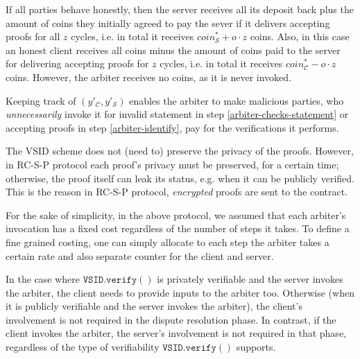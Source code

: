 \begin{remark} If all parties behave honestly,   then the server receives all its deposit back plus the amount of coins they initially agreed to pay the sever if it  delivers accepting proofs for all $z$ cycles, i.e. in total it receives $coin^{\scriptscriptstyle *}_{\scriptscriptstyle\mathcal S}+o\cdot z$ coins. Also, in this case an honest client receives all coins minus the amount of coins paid to the server for delivering accepting proofs for $z$ cycles, i.e. in total it receives $coin^{\scriptscriptstyle *}_{\scriptscriptstyle\mathcal C}-o\cdot z$ coins. However, the arbiter receives no coins, as it is never invoked. 


\begin{remark}
Keeping track of  $(y'_{\scriptscriptstyle\mathcal C},y'_{\scriptscriptstyle\mathcal S})$ enables the arbiter to make malicious parties, who \emph{unnecessarily} invoke  it for invalid statement in step \ref{arbiter-checks-statement} or  accepting proofs in step \ref{arbiter-identify}, pay  for the verifications it performs. 
\end{remark}





\end{remark}
\begin{remark} The VSID scheme  does not (need to) preserve the privacy of the proofs. However, in RC-S-P  protocol  each proof's privacy must be preserved, for a certain time; otherwise, the proof itself can leak its status, e.g. when it can be publicly verified. This is the reason in RC-S-P protocol,  \emph{encrypted} proofs are sent to the contract.   
\end{remark}


\begin{remark}
For the sake of simplicity, in the above protocol, we assumed that each arbiter's invocation has a fixed  cost regardless of the number of steps it takes. To define a fine grained costing, one can simply allocate to each step the arbiter takes a certain rate and also separate counter  for the client and server.  
\end{remark}

\begin{remark}
In the case where $\mathtt{VSID.verify}()$ is privately verifiable and    the server invokes the arbiter, the client needs to provide inputs to the arbiter too. Otherwise (when it is publicly verifiable and  the server invokes the arbiter), the client's involvement is not required in the dispute resolution phase.  In contrast, if the client invokes the arbiter, the server's involvement is not required in that phase, regardless of the type of verifiability $\mathtt{VSID.verify}()$ supports. 
\end{remark}

